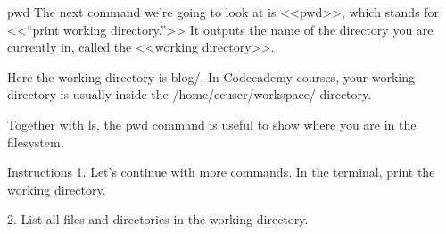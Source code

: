 pwd
    The next command we’re going to look at is <<pwd>>, which stands for <<“print working directory.”>> It outputs the name of the directory you are currently in, called the <<working directory>>.

    Here the working directory is blog/. In Codecademy courses, your working directory is usually inside the /home/ccuser/workspace/ directory.

    Together with ls, the pwd command is useful to show where you are in the filesystem.

Instructions
    1.
    Let’s continue with more commands. In the terminal, print the working directory.

    2.
    List all files and directories in the working directory.